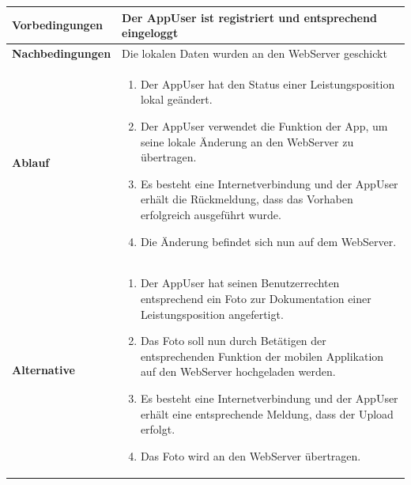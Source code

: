 \begin{longtable}[c]{|p{4cm}|p{10cm}|}
    \textbf{Vorbedingungen}             & Der AppUser ist registriert und entsprechend eingeloggt                                                                                                                                                                                                                                                                  \\ \hline
    \textbf{Nachbedingungen}            & Die lokalen Daten wurden an den WebServer geschickt                                                                                                                                                                                                                                                                      \\ \hline
    \textbf{Ablauf}                     &
    \begin{enumerate}
        \item Der AppUser hat den Status einer Leistungsposition lokal ge\"andert.
        \item Der AppUser verwendet die Funktion der App,  um seine lokale \"Anderung an den WebServer zu \"ubertragen.
        \item Es besteht eine Internetverbindung und der AppUser erh\"alt die R\"uckmeldung, dass das Vorhaben erfolgreich ausgef\"uhrt wurde.
        \item Die \"Anderung befindet sich nun auf dem WebServer.
    \end{enumerate}                                                                                                                                                                                                                                                                                                                                      \\ \hline
    \textbf{Alternative}                &
    \begin{enumerate}
        \item Der AppUser hat seinen Benutzerrechten entsprechend ein Foto zur Dokumentation einer Leistungsposition angefertigt.
        \item Das Foto soll nun durch Bet\"atigen der entsprechenden Funktion der mobilen Applikation auf den WebServer hochgeladen werden.
        \item Es besteht eine Internetverbindung und der AppUser erh\"alt eine entsprechende Meldung,  dass der Upload erfolgt.
        \item Das Foto wird an den WebServer \"ubertragen.

\end{enumerate}
\end{longtable}
